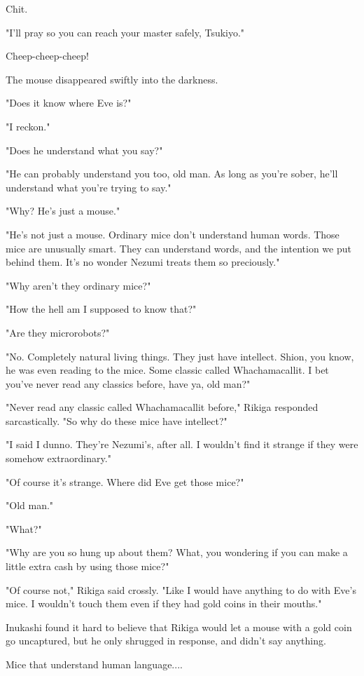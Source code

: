 Chit.

"I'll pray so you can reach your master safely, Tsukiyo."

Cheep-cheep-cheep!

The mouse disappeared swiftly into the darkness.

"Does it know where Eve is?"

"I reckon."

"Does he understand what you say?"

"He can probably understand you too, old man. As long as you're sober,
he'll understand what you're trying to say."

"Why? He's just a mouse."

"He's not just a mouse. Ordinary mice don't understand human words.
Those mice are unusually smart. They can understand words, and the
intention we put behind them. It's no wonder Nezumi treats them so
preciously."

"Why aren't they ordinary mice?"

"How the hell am I supposed to know that?"

"Are they microrobots?"

"No. Completely natural living things. They just have intellect. Shion,
you know, he was even reading to the mice. Some classic called
Whachamacallit. I bet you've never read any classics before, have ya,
old man?"

"Never read any classic called Whachamacallit before," Rikiga responded
sarcastically. "So why do these mice have intellect?"

"I said I dunno. They're Nezumi's, after all. I wouldn't find it strange
if they were somehow extraordinary."

"Of course it's strange. Where did Eve get those mice?"

"Old man."

"What?"

"Why are you so hung up about them? What, you wondering if you can make
a little extra cash by using those mice?"

"Of course not," Rikiga said crossly. "Like I would have anything to do
with Eve's mice. I wouldn't touch them even if they had gold coins in
their mouths."

Inukashi found it hard to believe that Rikiga would let a mouse with a
gold coin go uncaptured, but he only shrugged in response, and didn't
say anything.

Mice that understand human language....

